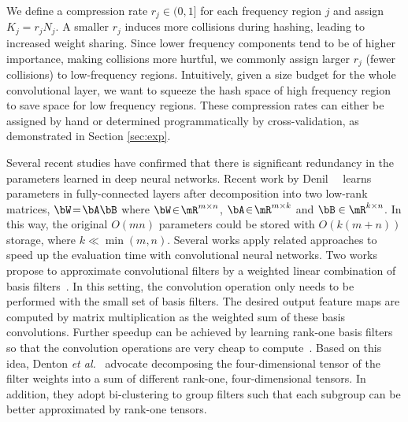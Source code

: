 \documentclass{article} %
\begin{document}
We define a compression rate  $r_j\!\in\!(0,1]$ for each frequency region $j$ and assign $K_j\!=\!r_j N_j$.
A smaller $r_j$ induces more collisions during hashing, leading to increased weight sharing.
Since lower frequency components tend to be of higher importance, making collisions more hurtful, we commonly assign larger $r_j$ (fewer collisions) to low-frequency regions.
Intuitively, given a size budget for the whole convolutional layer, we want to squeeze the hash space of high frequency region to save space for low frequency regions.
These compression rates can either be assigned by hand or determined programmatically by cross-validation, as demonstrated in Section \ref{sec:exp}.

Several recent studies have confirmed that there is significant redundancy in the parameters learned in deep neural networks.
Recent work by Denil~\etal{}~\cite{denil2013predicting} learns parameters in fully-connected layers after decomposition into two low-rank matrices, \ie{}$\bW\!=\!\bA\bB$ where $\bW\!\in\!\mR^{m\times n}$, $\bA\!\in\!\mR^{m\times k}$ and $\bB\in \mR^{k\times n}$.
In this way, the original $O(m n)$ parameters could be stored with $O(k(m+n))$ storage, where $k\ll \min(m,n)$.
Several works apply related approaches to speed up the evaluation time with convolutional neural networks.
Two works propose to approximate convolutional filters by a weighted linear combination of basis filters~\cite{rigamonti2013learning,jaderberg2014speeding}.
In this setting, the convolution operation only needs to be performed with the small set of basis filters.
The desired output feature maps are computed by matrix multiplication as the weighted sum of these basis convolutions.
Further speedup can be achieved by learning rank-one basis filters so that the convolution operations are very cheap to compute~\cite{denton2014exploiting,lebedev2014speeding}.
Based on this idea, Denton \emph{et al.}~\cite{denton2014exploiting} advocate decomposing the four-dimensional tensor of the filter weights into a sum of different rank-one, four-dimensional tensors.
In addition, they adopt bi-clustering to group filters such that each subgroup can be better approximated by rank-one tensors.
\end{document}
